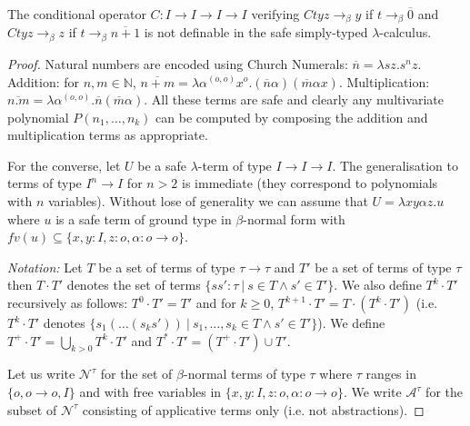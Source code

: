 \documentclass{llncs}
\newcommand{\encode}[1]{\overline{#1}} \newcommand\dps{\displaystyle}
\newcommand\union{\cup}
\newcommand\Union{\bigcup}
\newcommand\nat{\mathbb{N}}
\begin{document}
\begin{corollary}
The conditional operator $C:I\rightarrow I\rightarrow I \rightarrow I$ verifying  $C t y z \rightarrow_\beta y$  if $t \rightarrow_\beta \encode{0}$ and $C t y z \rightarrow_\beta z$ if $t \rightarrow_\beta \encode{n+1}$ is not definable in the safe simply-typed $\lambda$-calculus.
\end{corollary}
\begin{proof}
Natural numbers are encoded using Church Numerals: $\encode{n} = \lambda s z. s^n z$. 
Addition: for $n,m \in \nat$, $\encode{n+m} = \lambda \alpha^{(o,o)} x^o . (\encode{n} \alpha) (\encode{m} \alpha x)$. Multiplication: $\encode{n . m} = \lambda \alpha^{(o,o)} . \encode{n} (\encode{m} \alpha)$.
All these terms are safe and clearly any multivariate polynomial $P(n_1, \ldots, n_k)$ can be computed by composing the addition and multiplication terms as appropriate.

For the converse, let $U$ be a safe $\lambda$-term of type
$I\rightarrow I\rightarrow I$.  The generalisation to terms of type
$I^n \rightarrow I$ for $n>2$ is immediate (they correspond to
polynomials with $n$ variables). Without lose of generality we can
assume that $U = \lambda x y \alpha z. u$ where $u$ is a safe term of
ground type in $\beta$-normal form with $fv(u) \subseteq \{ x, y : I,
z :o, \alpha : o\rightarrow o \}$.

\emph{Notation:} Let $T$ be a set of terms of type $\tau \rightarrow \tau$ and $T'$ be a set of terms of type $\tau$ then $T \cdot T'$ denotes the set of terms $\{ s s' : \tau \ | \ s \in T \wedge s' \in T' \}$. We also define 
$T^k \cdot T'$ recursively as follows:  $T^0 \cdot T' = T'$ and
for $k\geq 0$, $T^{k+1} \cdot T' = T \cdot (T^k \cdot T')$ (i.e. $T^k \cdot T'$ denotes $\{ s_1( \ldots (s_k s'))  \ | \ s_1, \ldots, s_k \in T \wedge s' \in T' \}$). We define $T^+\cdot T' = \Union_{k > 0} T^k \cdot T'$ and 
$T^*\cdot T' = (T^+\cdot T') \union T'$.

Let us write $\mathcal{N}^\tau$ for the set of $\beta$-normal terms of
type $\tau$ where $\tau$ ranges in $\{ o, o\rightarrow o, I \}$ and
with free variables in $\{ x,y:I, z:o, \alpha:o\rightarrow o\}$. We
write $\mathcal{A}^\tau$ for the subset of $\mathcal{N}^\tau$
consisting of applicative terms only (i.e. not abstractions).


\end{proof}
\end{document}
